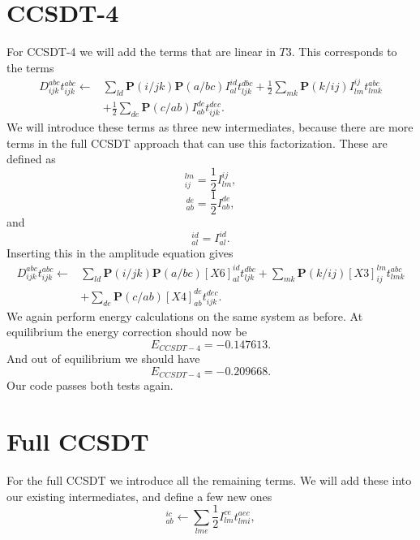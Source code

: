 \section{CCSDT-4}
For CCSDT-4 we will add the terms that are linear in $T3$. This corresponds to the terms
\begin{align}
D_{ijk}^{abc} t_{ijk}^{abc} \leftarrow &
\sum _{ld}
\textbf{P}(i/jk) \textbf{P}(a/bc) 
I_{al}^{id} t^{dbc}_{ljk}
+
\frac{1}{2} \sum_{mk}
\textbf{P}(k/ij) I_{lm}^{ij} t_{lmk}^{abc}
\nonumber \\ &
+
\frac{1}{2} \sum_{de} 
\textbf{P}(c/ab) I_{ab}^{de} t^{dec}_{ijk} .
\end{align}
We will introduce these terms as three new intermediates, because there are more terms in the full CCSDT approach 
that can use this factorization. These are defined as
\begin{equation}
[X3]_{ij}^{lm} = \frac{1}{2} I_{lm}^{ij},
\end{equation}
\begin{equation}
[X4]_{ab}^{de} = \frac{1}{2} I_{ab}^{de},
\end{equation}
and
\begin{equation}
[X6]_{al}^{id} = I_{al}^{id} .
\end{equation}
Inserting this in the amplitude equation gives
\begin{align}
D_{ijk}^{abc} t_{ijk}^{abc} \leftarrow &
\sum _{ld}
\textbf{P}(i/jk) \textbf{P}(a/bc) 
[X6]_{al}^{id} t^{dbc}_{ljk}
+
 \sum_{mk}
\textbf{P}(k/ij) [X3]_{ij}^{lm} t_{lmk}^{abc}
\nonumber \\ &
+
\sum_{de}
\textbf{P}(c/ab)[X4]_{ab}^{de}  t^{dec}_{ijk} .
\end{align}
We again perform energy calculations on the same system as before. At equilibrium the energy correction should now be
\begin{equation}
E_{CCSDT-4} = -0.147613 .
\end{equation}
And out of equilibrium we should have
\begin{equation}
E_{CCSDT-4} = -0.209668 .
\end{equation}
Our code passes both tests again. 
\section{Full CCSDT}
For the full CCSDT we introduce all the remaining terms. We will add these into our existing intermediates, and define a few new ones
\begin{equation}
[X1]_{ab}^{ic} \leftarrow 
\sum_{lme}
\frac{1}{2}
I_{lm}^{ce} t_{lmi}^{aec},
\end{equation}

